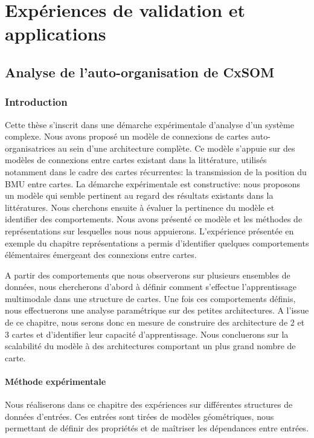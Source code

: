 \part{Expériences de validation et applications}
\chapter{Analyse de l'auto-organisation de CxSOM}\label{chap:analyse}
\graphicspath{{06-Analyse/}}
\minitoc

\section{Introduction}

Cette thèse s'inscrit dans une démarche expérimentale d'analyse d'un système complexe.
Nous avons proposé un modèle de connexions de cartes auto-organisatrices au sein d'une architecture complète.
Ce modèle s'appuie sur des modèles de connexions entre cartes existant dans la littérature, utilisés notamment dans le cadre des cartes récurrentes: la transmission de la position du BMU entre cartes.
La démarche expérimentale est constructive: nous proposons un modèle qui semble pertinent au regard des résultats existants dans la littératures. Nous cherchons ensuite à évaluer la pertinence du modèle et identifier des comportements.
Nous avons présenté ce modèle et les méthodes de représentations sur lesquelles nous nous appuierons.
L'expérience présentée en exemple du chapitre représentations a permis d'identifier quelques comportements élémentaires émergeant des connexions entre cartes.

A partir des comportements que nous observerons sur plusieurs ensembles de données, nous chercherons d'abord à définir comment s'effectue l'apprentissage multimodale dans une structure de cartes.
Une fois ces comportements définis, nous effectuerons une analyse paramétrique sur des petites architectures.
A l'issue de ce chapitre, nous serons donc en mesure de construire des architecture de 2 et 3 cartes et d'identifier leur capacité d'apprentissage. Nous concluerons sur la scalabilité du modèle à des architectures comportant un plus grand nombre de carte.

\subsection{Méthode expérimentale}

Nous réaliserons dans ce chapitre des expériences sur différentes structures de données d'entrées. Ces entrées sont tirées de modèles géométriques, nous permettant de définir des propriétés et de maîtriser les dépendances entre entrées. 

